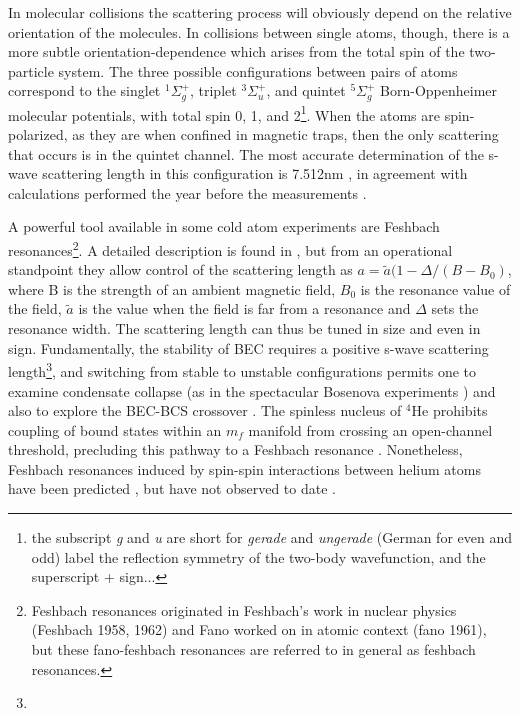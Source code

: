 	In molecular collisions the scattering process will obviously depend on the relative orientation of the molecules. In collisions between single atoms, though, there is a more subtle orientation-dependence which arises from the total spin of the two-particle system. The three possible configurations between pairs of \mhe atoms correspond to the singlet $^1\Sigma_g^+$, triplet $^3\Sigma_u^+$, and quintet $^5\Sigma_g^+$ Born-Oppenheimer molecular potentials, with total spin 0, 1, and 2\footnote{the subscript \emph{g} and \emph{u} are short for \emph{gerade} and \emph{ungerade} (German for even and odd) label the reflection symmetry of the two-body wavefunction, and the superscript + sign...}. When the atoms are spin-polarized, as they are when confined in magnetic traps, then the only scattering that occurs is in the quintet channel. The most accurate determination of the s-wave scattering length in this configuration is 7.512nm \cite{moal06}, in agreement with calculations performed the year before the measurements \cite{przybytek05}. 
	
	A powerful tool available in some cold atom experiments are Feshbach resonances\footnote{Feshbach resonances originated in Feshbach's work in nuclear physics (Feshbach 1958, 1962) and Fano worked on in atomic context (fano 1961), but these fano-feshbach resonances are referred to in general as feshbach resonances. }. A detailed description is found in \cite{Chin10}, but from an operational standpoint they allow control of the scattering length as $a = \tilde{a}(1-\Delta/(B-B_0)$, where B is the strength of an ambient magnetic field, $B_0$ is the resonance value of the field, $\tilde{a}$ is the value when the field is far from a resonance and $\Delta$ sets the resonance width. The scattering length can thus be tuned in size and even in sign. Fundamentally, the stability of BEC requires a positive s-wave scattering length\footnote{}, and switching from stable to unstable configurations permits one to examine condensate collapse (as in the spectacular Bosenova experiments \cite{papers}) and also to explore the BEC-BCS crossover \cite{papers}. The spinless nucleus of $^4$He prohibits coupling of bound states within an $m_f$  manifold from crossing an open-channel threshold, precluding this pathway to a Feshbach resonance \cite{goosen10}. Nonetheless, Feshbach resonances induced by spin-spin interactions between helium atoms have been predicted \cite{venturi99, goosen10}, but have not observed to date \cite{borbely12}. 
	
